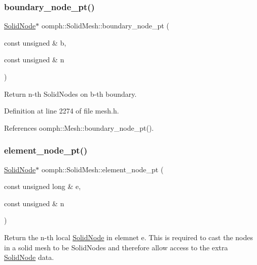 \subsubsection{\texorpdfstring{boundary\+\_\+node\+\_\+pt()}{boundary\_node\_pt()}}
{\footnotesize\ttfamily \hyperlink{classoomph_1_1SolidNode}{Solid\+Node}$\ast$ oomph\+::\+Solid\+Mesh\+::boundary\+\_\+node\+\_\+pt (\begin{DoxyParamCaption}\item[{const unsigned \&}]{b,  }\item[{const unsigned \&}]{n }\end{DoxyParamCaption})\hspace{0.3cm}{\ttfamily [inline]}}



Return n-\/th Solid\+Nodes on b-\/th boundary. 



Definition at line 2274 of file mesh.\+h.



References oomph\+::\+Mesh\+::boundary\+\_\+node\+\_\+pt().

\mbox{\label{classoomph_1_1SolidMesh_a8ef82c5fa6460e47eaaf02a681147649}} 
\subsubsection{\texorpdfstring{element\+\_\+node\+\_\+pt()}{element\_node\_pt()}}
{\footnotesize\ttfamily \hyperlink{classoomph_1_1SolidNode}{Solid\+Node}$\ast$ oomph\+::\+Solid\+Mesh\+::element\+\_\+node\+\_\+pt (\begin{DoxyParamCaption}\item[{const unsigned long \&}]{e,  }\item[{const unsigned \&}]{n }\end{DoxyParamCaption})\hspace{0.3cm}{\ttfamily [inline]}}



Return the n-\/th local \hyperlink{classoomph_1_1SolidNode}{Solid\+Node} in elemnet e. This is required to cast the nodes in a solid mesh to be Solid\+Nodes and therefore allow access to the extra \hyperlink{classoomph_1_1SolidNode}{Solid\+Node} data. 



